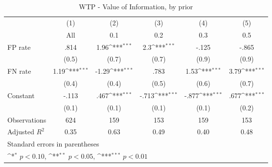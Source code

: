 \begin{table}[htbp]\centering
\def\sym#1{\ifmmode^{#1}\else\(^{#1}\)\fi}
\caption{WTP - Value of Information, by prior}
\begin{tabular}{l*{5}{c}}
\hline\hline
                &\multicolumn{1}{c}{(1)}&\multicolumn{1}{c}{(2)}&\multicolumn{1}{c}{(3)}&\multicolumn{1}{c}{(4)}&\multicolumn{1}{c}{(5)}\\
                &\multicolumn{1}{c}{All}&\multicolumn{1}{c}{0.1}&\multicolumn{1}{c}{0.2}&\multicolumn{1}{c}{0.3}&\multicolumn{1}{c}{0.5}\\
\hline
FP rate         &     .814         &     1.96\sym{***}&      2.3\sym{***}&    -.125         &    -.865         \\
                &    (0.5)         &    (0.7)         &    (0.7)         &    (0.9)         &    (0.9)         \\
FN rate         &     1.19\sym{***}&    -1.29\sym{***}&     .783         &     1.53\sym{***}&     3.79\sym{***}\\
                &    (0.4)         &    (0.4)         &    (0.5)         &    (0.6)         &    (0.7)         \\
Constant        &    -.113         &     .467\sym{***}&    -.713\sym{***}&    -.877\sym{***}&     .677\sym{***}\\
                &    (0.1)         &    (0.1)         &    (0.1)         &    (0.1)         &    (0.2)         \\
\hline
Observations    &      624         &      159         &      153         &      159         &      153         \\
Adjusted \(R^{2}\)&     0.35         &     0.63         &     0.49         &     0.40         &     0.48         \\
\hline\hline
\multicolumn{6}{l}{\footnotesize Standard errors in parentheses}\\
\multicolumn{6}{l}{\footnotesize \sym{*} \(p<0.10\), \sym{**} \(p<0.05\), \sym{***} \(p<0.01\)}\\
\end{tabular}
\end{table}

